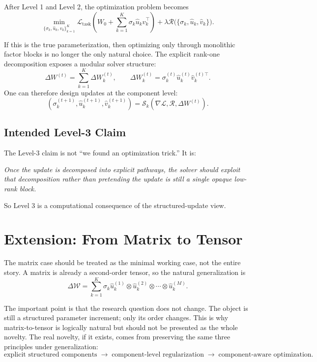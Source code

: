 \documentclass[11pt]{article}
\begin{document}
After Level 1 and Level 2, the optimization problem becomes
\[
\min_{\{\sigma_k,\hat{u}_k,\hat{v}_k\}_{k=1}^{K}}
\mathcal{L}_{\text{task}}
\left(
W_0+\sum_{k=1}^{K}\sigma_k \hat{u}_k \hat{v}_k^\top
\right)
+ \lambda \mathcal{R}\big(\{\sigma_k,\hat{u}_k,\hat{v}_k\}\big).
\]

If this is the true parameterization, then optimizing only through monolithic factor blocks is no longer the only natural choice. The explicit rank-one decomposition exposes a modular solver structure:
\[
\Delta W^{(t)} = \sum_{k=1}^{K}\Delta W_k^{(t)},\qquad
\Delta W_k^{(t)} = \sigma_k^{(t)} \hat{u}_k^{(t)} \hat{v}_k^{(t)\top}.
\]
One can therefore design updates at the component level:
\[
(\sigma_k^{(t+1)},\hat{u}_k^{(t+1)},\hat{v}_k^{(t+1)})
=
\mathcal{S}_k(\nabla \mathcal{L}, \mathcal{R}, \Delta W^{(t)}).
\]

\subsection{Intended Level-3 Claim}

The Level-3 claim is not ``we found an optimization trick.'' It is:

\emph{Once the update is decomposed into explicit pathways, the solver should exploit that decomposition rather than pretending the update is still a single opaque low-rank block.}

So Level 3 is a computational consequence of the structured-update view.

\section{Extension: From Matrix to Tensor}

The matrix case should be treated as the minimal working case, not the entire story. A matrix is already a second-order tensor, so the natural generalization is
\[
\Delta \mathcal{W}
=
\sum_{k=1}^{K}
\sigma_k
\hat{u}^{(1)}_k \otimes \hat{u}^{(2)}_k \otimes \cdots \otimes \hat{u}^{(M)}_k.
\]

The important point is that the research question does not change. The object is still a structured parameter increment; only its order changes. This is why matrix-to-tensor is logically natural but should not be presented as the whole novelty. The real novelty, if it exists, comes from preserving the same three principles under generalization:
\[
\text{explicit structured components}
\;\rightarrow\;
\text{component-level regularization}
\;\rightarrow\;
\text{component-aware optimization}.
\]
\end{document}
